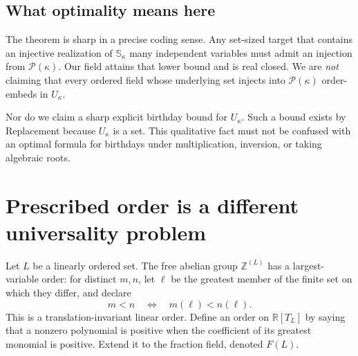 \documentclass[11pt,letterpaper]{article}
\theoremstyle{definition}
\theoremstyle{remark}
\newcommand{\Pow}{\mathcal P}
\newcommand{\R}{\mathbb R}
\newcommand{\Z}{\mathbb Z}
\begin{document}
\subsection{What optimality means here}
The theorem is sharp in a precise coding sense. Any set-sized target that contains an injective realization of $\mathbb S_\kappa$ many independent variables must admit an injection from $\Pow(\kappa)$. Our field attains that lower bound and is real closed. We are \emph{not} claiming that every ordered field whose underlying set injects into $\Pow(\kappa)$ order-embeds in $U_\kappa$.

Nor do we claim a sharp explicit birthday bound for $U_\kappa$. Such a bound exists by Replacement because $U_\kappa$ is a set. This qualitative fact must not be confused with an optimal formula for birthdays under multiplication, inversion, or taking algebraic roots.

\section{Prescribed order is a different universality problem}
\label{hset:kw:sec:order}

Let $L$ be a linearly ordered set. The free abelian group $\Z^{(L)}$ has a largest-variable order: for distinct $m,n$, let $\ell$ be the greatest member of the finite set on which they differ, and declare
\begin{equation}\label{hset:kw:eq:revlex}
m<n\quad\Longleftrightarrow\quad m(\ell)<n(\ell).
\end{equation}
This is a translation-invariant linear order. Define an order on $\R[T_L]$ by saying that a nonzero polynomial is positive when the coefficient of its greatest monomial is positive. Extend it to the fraction field, denoted $F(L)$.
\end{document}
